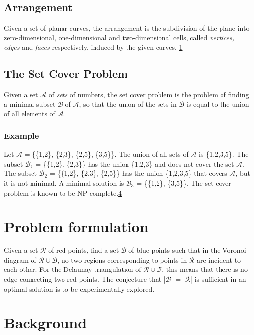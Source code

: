 \documentclass[a4paper,12pt]{article}
\begin{document}
\subsection{Arrangement}
\label{sec:arrangement}
Given a set of planar curves, the arrangement is the subdivision of the plane into zero-dimensional, one-dimensional and two-dimensional cells, called \emph{vertices, edges} and \emph{faces} respectively, induced by the given curves. \hyperref[ref:cgal]{1}

\subsection{The Set Cover Problem}
Given a set $\mathcal A$ of \emph{sets} of numbers, the set cover problem is the problem of finding a minimal subset $\mathcal B$ of $\mathcal A$, so that the union of the sets in $\mathcal B$ is equal to the union of all elements of $\mathcal A$.

\subsubsection*{Example}
Let $\mathcal A$ =  \{\{1,2\}, \{2,3\}, \{2,5\}, \{3,5\}\}. The union of all sets of $\mathcal A$ is \{1,2,3,5\}. \newline
The subset $\mathcal B_1$ = \{\{1,2\}, \{2,3\}\} has the union \{1,2,3\} and does not cover the set $\mathcal A$. \newline
The subset $\mathcal B_2$ = \{\{1,2\}, \{2,3\}, \{2,5\}\} has the union \{1,2,3,5\} that covers $\mathcal A$, but it is not minimal. \newline
A minimal solution is $\mathcal B_3$ = \{\{1,2\}, \{3,5\}\}. \newline
The set cover problem is known to be NP-complete.\hyperref[ref:karp]{4}
\section{Problem formulation}
Given a set $\mathcal{R}$ of red points, find a set $\mathcal{B}$ of blue points such that in the Voronoi diagram of $\mathcal{R} \cup \mathcal{B}$, no two regions corresponding to points in $\mathcal{R}$ are incident to each other. For the Delaunay triangulation of $\mathcal{R} \cup \mathcal{B}$, this means that there is no edge connecting two red points. The conjecture that |$\mathcal{B}$| = |$\mathcal{R}$| is sufficient in an optimal solution is to be experimentally explored.


\section{Background}
\end{document}
